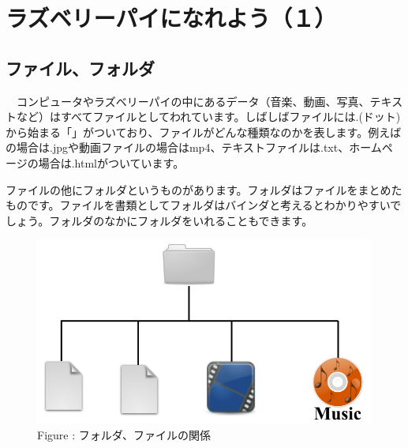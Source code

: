 \documentclass[a4paper,12pt]{jarticle}
\begin{document}
\section{ラズベリーパイになれよう（１）}
\subsection{ファイル、フォルダ}
\ \ コンピュータやラズベリーパイの中にあるデータ（音楽、動画、写真、テキストなど）はすべてファイルとしてわれています。しばしばファイルには.(ドット)から始まる「」がついており、ファイルがどんな種類なのかを表します。例えばの場合は.jpgや動画ファイルの場合はmp4、テキストファイルは.txt、ホームページの場合は.htmlがついています。

ファイルの他にフォルダというものがあります。フォルダはファイルをまとめたものです。ファイルを書類としてフォルダはバインダと考えるとわかりやすいでしょう。フォルダのなかにフォルダをいれることもできます。



\begin{figure}[hb]
  \centering
  \begin{minipage}{13.148cm}


    \includegraphics[width=13.148cm]{figure15.png}
    {\upshape
      \newline
      Figure :
      フォルダ、ファイルの関係}
  \end{minipage}
\end{figure}
\end{document}
